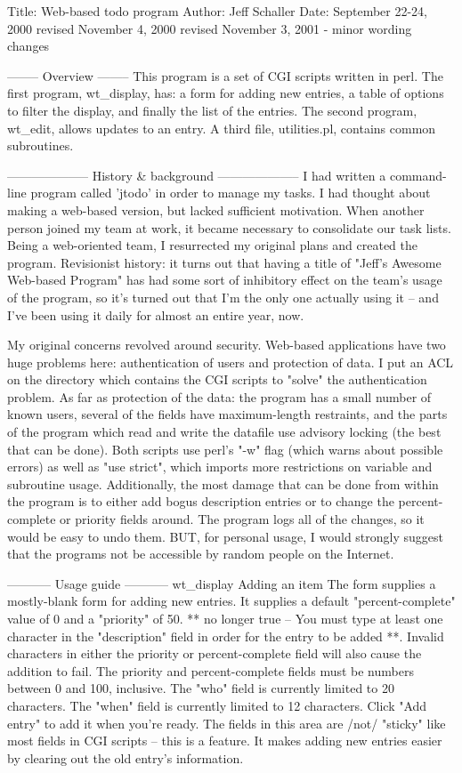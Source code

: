 Title: Web-based todo program
Author: Jeff Schaller
Date: September 22-24, 2000
	revised November 4, 2000
	revised November 3, 2001 - minor wording changes

--------
Overview
--------
	This program is a set of CGI scripts written in perl. The first
program, wt_display, has: a form for adding new entries, a table of
options to filter the display, and finally the list of the entries. The
second program, wt_edit, allows updates to an entry. A third file,
utilities.pl, contains common subroutines.

--------------------
History & background
--------------------
	I had written a command-line program called 'jtodo' in order to
manage my tasks. I had thought about making a web-based version, but lacked
sufficient motivation. When another person joined my team at work, it
became necessary to consolidate our task lists.  Being a web-oriented team, 
I resurrected my original plans and created the program.
	Revisionist history: it turns out that having a title of "Jeff's
Awesome Web-based Program" has had some sort of inhibitory effect on the
team's usage of the program, so it's turned out that I'm the only one
actually using it -- and I've been using it daily for almost an entire 
year, now.

My original concerns revolved around security.  Web-based applications have
two huge problems here: authentication of users and protection of data. I
put an ACL on the directory which contains the CGI scripts to "solve" the 
authentication problem.  As far as protection of the data: the program has
a small number of known users, several of the fields have maximum-length
restraints, and the parts of the program which read and write the datafile
use advisory locking (the best that can be done). Both scripts use perl's 
"-w" flag (which warns about possible errors) as well as "use strict", 
which imports more restrictions on variable and subroutine usage.
Additionally, the most damage that can be done from within the program is
to either add bogus description entries or to change the percent-complete
or priority fields around. The program logs all of the changes, so it would
be easy to undo them.
BUT, for personal usage, I would strongly suggest that the programs not 
be accessible by random people on the Internet.

-----------
Usage guide
-----------
wt_display
	Adding an item
		The form supplies a mostly-blank form for adding new entries.
		It supplies a default "percent-complete" value of 0 and a "priority"
		of 50.  ** no longer true -- You must type at least one character in the "description"
		field in order for the entry to be added **.  Invalid characters in
		either the priority or percent-complete field will also cause the
		addition to fail. The priority and percent-complete fields must
		be numbers between 0 and 100, inclusive.  The "who" field is
		currently limited to 20 characters. The "when" field is currently
		limited to 12 characters.  Click "Add entry" to add it when you're
		ready. The fields in this area are /not/ "sticky" like most fields
		in CGI scripts -- this is a feature. It makes adding new entries
		easier by clearing out the old entry's information.


